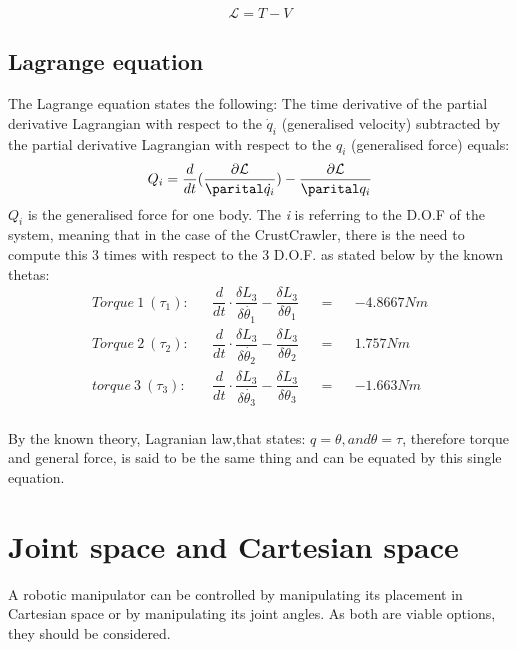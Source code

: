 \begin{equation}
    \mathcal{L}=T-V
\end{equation}

\subsection*{Lagrange equation}
The Lagrange equation states the following: The time derivative of the partial derivative Lagrangian with respect to the $\Dot{q}_i$ (generalised velocity) subtracted by the partial derivative Lagrangian with respect to the $q_i$ (generalised force) equals:
\begin{equation}
    Q_i = \frac{d}{dt}(\frac{\partial\mathcal{L}}{\parital \Dot{q_i}})-\frac{\partial\mathcal{L}}{\parital q_i}
\end{equation}
$Q_i$ is the generalised force for one body. The \textit{i} is referring to the D.O.F of the system, meaning that in the case of the CrustCrawler, there is the need to compute this 3 times with respect to the 3 D.O.F. as stated below by the known thetas:\\

\begin{align}
    Torque\ 1\ (\tau_1):&& \dfrac{d}{dt}\cdot\dfrac{\delta L_3}{\delta\dot{\theta_1}}-\dfrac{\delta L_3}{\delta\theta_1}&&=&&-4.8667Nm\\
    Torque\ 2\ (\tau_2):&& \dfrac{d}{dt}\cdot\dfrac{\delta L_3}{\delta \dot{\theta_2}}-\dfrac{\delta L_3}{\delta\theta_2}&&=&& 1.757Nm\\
    torque\ 3\ (\tau_3):&&\dfrac{d}{dt}\cdot\dfrac{\delta L_3}{\delta \dot{\theta_3}}-\dfrac{\delta L_3}{\delta\theta_3}&&=&&-1.663Nm
\end{align}
\\

By the known theory, Lagranian law,that states: \(q=\theta, and  \theta=\tau\), therefore torque and general force, is said to be the same thing and can be equated by this single equation.
 
 
 \section{Joint space and Cartesian space}
 A robotic manipulator can be controlled by manipulating its placement in Cartesian space or by manipulating its joint angles. As both are viable options, they should be considered.\\
